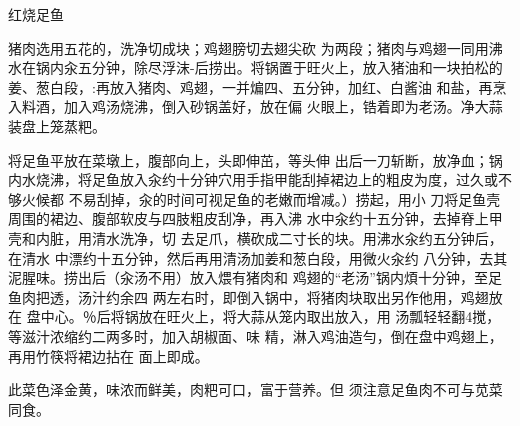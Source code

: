 \begin{recipe}{红烧足鱼}

\ingredients



\cooking

\step 猪肉选用五花的，洗净切成块；鸡翅膀切去翅尖砍
为两段；猪肉与鸡翅一同用沸水在锅内汆五分钟，除尽浮沫-后捞出。将锅置于旺火上，放入猪油和一块拍松的姜、葱白段，:再放入猪肉、鸡翅，一并煸四、五分钟，加红、白酱油 和盐，再烹入料酒，加入鸡汤烧沸，倒入砂锅盖好，放在偏 火眼上，锆着即为老汤。净大蒜装盘上笼蒸粑。

\step 将足鱼平放在菜墩上，腹部向上，头即伸茁，等头伸
出后一刀斩断，放净血；锅内水烧沸，将足鱼放入汆约十分钟穴用手指甲能刮掉裙边上的粗皮为度，过久或不够火候都 不易刮掉，汆的时间可视足鱼的老嫩而增减。）捞起，用小 刀将足鱼壳周围的裙边、腹部软皮与四肢粗皮刮净，再入沸 水中汆约十五分钟，去掉脊上甲壳和内脏，用清水洗净，切 去足爪，横砍成二寸长的块。用沸水汆约五分钟后，在清水 中漂约十五分钟，然后再用清汤加姜和葱白段，用微火汆约 八分钟，去其泥腥味。捞出后（汆汤不用）放入煨有猪肉和 鸡翅的“老汤”锅内煩十分钟，至足鱼肉把透，汤汁约余四 两左右时，即倒入锅中，将猪肉块取出另作他用，鸡翅放在 盘中心。％后将锅放在旺火上，将大蒜从笼内取出放入，用 汤瓢轻轻翻4搅，等滋汁浓缩约二两多时，加入胡椒面、味 精，淋入鸡油造勻，倒在盘中鸡翅上，再用竹筷将裙边拈在 面上即成。

\notes

此菜色泽金黄，味浓而鲜美，肉粑可口，富于营养。但 须注意足鱼肉不可与苋菜同食。

\end{recipe}

